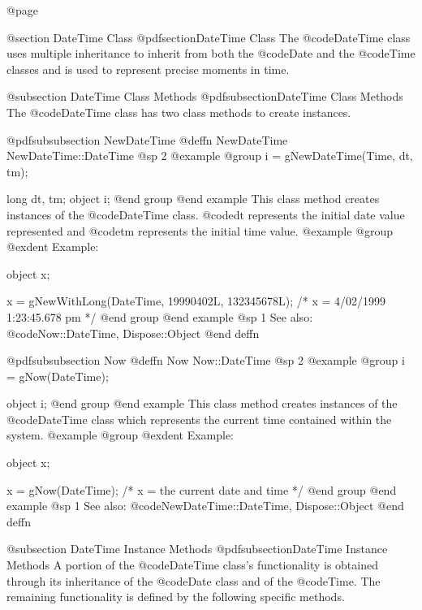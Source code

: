 @page

@section DateTime Class
@pdfsection{DateTime Class}
The @code{DateTime} class uses multiple inheritance to inherit
from both the @code{Date} and the @code{Time} classes and is
used to represent precise moments in time.





@subsection DateTime Class Methods
@pdfsubsection{DateTime Class Methods}
The @code{DateTime} class has two class methods to create instances.






@pdfsubsubsection {NewDateTime}
@deffn {NewDateTime} NewDateTime::DateTime
@sp 2
@example
@group
i = gNewDateTime(Time, dt, tm);

long    dt, tm;
object  i;
@end group
@end example
This class method creates instances of the @code{DateTime} class.  @code{dt}
represents the initial date value represented and @code{tm} represents
the initial time value.
@example
@group
@exdent Example:

object  x;

x = gNewWithLong(DateTime, 19990402L, 132345678L);
/*  x = 4/02/1999 1:23:45.678 pm  */
@end group
@end example
@sp 1
See also:  @code{Now::DateTime, Dispose::Object}
@end deffn










@pdfsubsubsection {Now}
@deffn {Now} Now::DateTime
@sp 2
@example
@group
i = gNow(DateTime);

object  i;
@end group
@end example
This class method creates instances of the @code{DateTime} class which
represents the current time contained within the system.
@example
@group
@exdent Example:

object  x;

x = gNow(DateTime);   /*  x = the current date and time  */
@end group
@end example
@sp 1
See also:  @code{NewDateTime::DateTime, Dispose::Object}
@end deffn










@subsection DateTime Instance Methods
@pdfsubsection{DateTime Instance Methods}
A portion of the @code{DateTime} class's functionality is obtained through
its inheritance of the @code{Date} class and of the @code{Time}.  The
remaining functionality is defined by the following specific methods.







